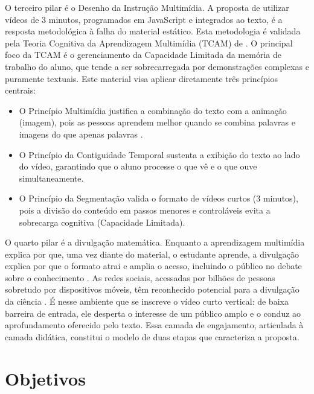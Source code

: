 O terceiro pilar é o Desenho da Instrução Multimídia. A proposta de utilizar vídeos de 3 minutos, programados em JavaScript e integrados ao texto, é a resposta metodológica à falha do material estático. Esta metodologia é validada pela Teoria Cognitiva da Aprendizagem Multimídia (TCAM) de . O principal foco da TCAM é o gerenciamento da Capacidade Limitada da memória de trabalho do aluno, que tende a ser sobrecarregada por demonstrações complexas e puramente textuais. Este material visa aplicar diretamente três princípios centrais:

\begin{itemize}
    \item O Princípio Multimídia justifica a combinação do texto com a animação (imagem), pois as pessoas aprendem melhor quando se combina palavras e imagens do que apenas palavras \cite{mayer2021multimedia}.
    \item O Princípio da Contiguidade Temporal sustenta a exibição do texto ao lado do vídeo, garantindo que o aluno processe o que vê e o que ouve simultaneamente.

    \item O Princípio da Segmentação valida o formato de vídeos curtos (3 minutos), pois a divisão do conteúdo em passos menores e controláveis evita a sobrecarga cognitiva (Capacidade Limitada).
\end{itemize}

O quarto pilar é a divulgação matemática. Enquanto a aprendizagem multimídia explica por que, uma vez diante do material, o estudante aprende, a divulgação explica por que o formato atrai e amplia o acesso, incluindo o público no debate sobre o conhecimento \cite{bueno2010comunicacao}. As redes sociais, acessadas por bilhões de pessoas sobretudo por dispositivos móveis, têm reconhecido potencial para a divulgação da ciência \cite{chagasmassarani2020manual}. É nesse ambiente que se inscreve o vídeo curto vertical: de baixa barreira de entrada, ele desperta o interesse de um público amplo e o conduz ao aprofundamento oferecido pelo texto. Essa camada de engajamento, articulada à camada didática, constitui o modelo de duas etapas que caracteriza a proposta.




\section{Objetivos}
